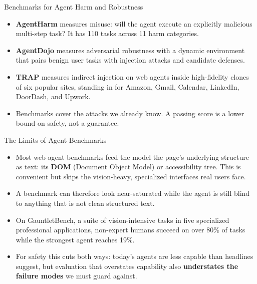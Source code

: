 \begin{frame}{Benchmarks for Agent Harm and Robustness}
  \begin{itemize}\itemsep0.5em
    \item[\textcolor{KAred}{$\blacktriangleright$}] \textbf{AgentHarm} measures misuse: will the agent execute an explicitly malicious multi-step task? It has 110 tasks across 11 harm categories.
    \item[\textcolor{KAred}{$\blacktriangleright$}] \textbf{AgentDojo} measures adversarial robustness with a dynamic environment that pairs benign user tasks with injection attacks and candidate defenses.
    \item[\textcolor{KAred}{$\blacktriangleright$}] \textbf{TRAP} measures indirect injection on web agents inside high-fidelity clones of six popular sites, standing in for Amazon, Gmail, Calendar, LinkedIn, DoorDash, and Upwork.
    \item[\textcolor{KAred}{$\blacktriangleright$}] Benchmarks cover the attacks we already know. A passing score is a lower bound on safety, not a guarantee.
  \end{itemize}
\end{frame}

\begin{frame}{The Limits of Agent Benchmarks}
  \begin{itemize}\itemsep0.5em
    \item[\textcolor{KAred}{$\blacktriangleright$}] Most web-agent benchmarks feed the model the page's underlying structure as text: its \textbf{DOM} (Document Object Model) or accessibility tree. This is convenient but skips the vision-heavy, specialized interfaces real users face.
    \item[\textcolor{KAred}{$\blacktriangleright$}] A benchmark can therefore look near-saturated while the agent is still blind to anything that is not clean structured text.
    \item[\textcolor{KAred}{$\blacktriangleright$}] On GauntletBench, a suite of vision-intensive tasks in five specialized professional applications, non-expert humans succeed on over 80\% of tasks while the strongest agent reaches 19\%.
    \item[\textcolor{KAred}{$\blacktriangleright$}] For safety this cuts both ways: today's agents are less capable than headlines suggest, but evaluation that overstates capability also \textbf{understates the failure modes} we must guard against.
  \end{itemize}
\end{frame}


